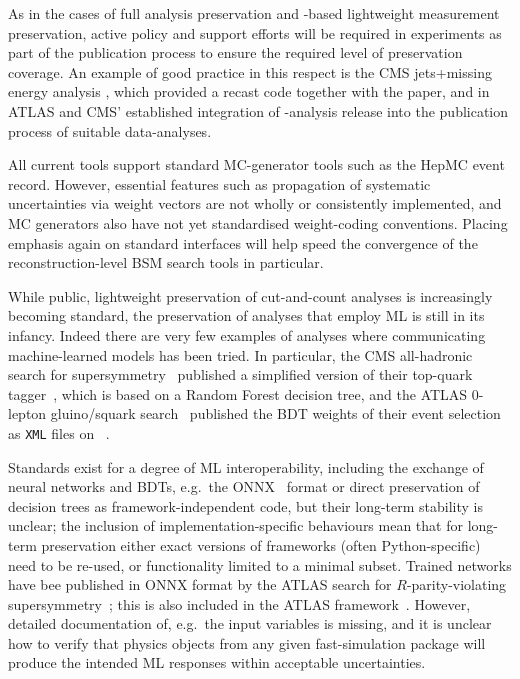 \documentclass[11pt]{article}
\begin{document}
As in the cases of full analysis preservation and \rivet-based lightweight measurement preservation, active policy and support efforts will be required in experiments as part of the publication process to ensure the required level of preservation coverage. An example of good practice in this respect is the \gls{CMS} jets+missing energy analysis \cite{CMS:2021far}, which provided a \madanalysis recast code \cite{Albert:2774586,DVN/IRF7ZL_2021} together with the paper, and in \gls{ATLAS} and \gls{CMS}' established integration of \rivet-analysis release into the publication process of suitable data-analyses.

All current tools support standard MC-generator tools such as the HepMC event record. However, essential features such as propagation of systematic uncertainties via weight vectors are not wholly or consistently implemented, and MC generators also have not yet standardised weight-coding conventions. Placing emphasis again on standard interfaces will help speed the convergence of the reconstruction-level \gls{BSM} search tools in particular.

While public, lightweight preservation of cut-and-count analyses is increasingly becoming standard, the preservation of analyses that employ \gls{ML} is still in its infancy.
Indeed there are very few examples of analyses where communicating machine-learned models has been tried. In particular, the \gls{CMS} all-hadronic search for supersymmetry~\cite{CMS:2017qxu} published a simplified version of their top-quark tagger~\cite{cms:toptagger}, which is based on a Random Forest decision tree, and the \gls{ATLAS} 0-lepton gluino/squark search~\cite{ATLAS:2020syg,Uno:2763449} published the \gls{BDT} weights of their event selection as \texttt{XML} files on \hepdata~\cite{hepdata.95664.v2/r8}.

Standards exist for a degree of \gls{ML} interoperability, including the exchange of neural networks and \glspl{BDT}, e.g.~the
\gls{ONNX}~\cite{onnx} format or direct preservation of decision trees as framework-independent code, but their long-term stability is unclear; the inclusion of implementation-specific behaviours mean that for long-term preservation either exact versions of frameworks (often Python-specific) need to be re-used, or functionality limited to a minimal subset. Trained networks have bee published in \gls{ONNX} format by the \gls{ATLAS} search for $R$-parity-violating supersymmetry~\cite{ATLAS:2021fbt,hepdata.104860.v1/r3}; this is also included in the \gls{ATLAS} \simpleanalysis framework~\cite{atlas:simpleanalysis}.
However, detailed documentation of, e.g.~the input variables is missing, and it is unclear how to verify that physics objects from any given fast-simulation package will produce the intended \gls{ML} responses within acceptable uncertainties.
\end{document}

